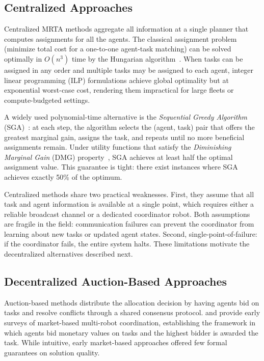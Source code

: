 \subsection{Centralized Approaches}
      \label{subsec:bg_centralized}

Centralized MRTA methods aggregate all information at a single planner that
computes assignments for all the agents.
The classical assignment problem (minimize total cost for a one-to-one
agent-task matching) can be solved optimally in $O(n^3)$ time by the Hungarian
algorithm~\cite{kuhn1955hungarian}.
When tasks can be assigned in any order and multiple tasks may be assigned to
each agent, integer linear programming (ILP) formulations achieve global
optimality but at exponential worst-case cost, rendering them impractical
for large fleets or compute-budgeted settings.

A widely used polynomial-time alternative is the \emph{Sequential Greedy
Algorithm} (SGA)~\cite{minoux1978accelerated}: at each step, the algorithm
selects the (agent, task) pair that offers the greatest marginal gain, assigns
the task, and repeats until no more beneficial assignments remain.
Under utility functions that satisfy the \emph{Diminishing Marginal Gain}
(DMG) property~\cite{fisher1978analysis}, SGA achieves at least half the
optimal assignment value.
This guarantee is tight: there exist instances where SGA achieves exactly
50\% of the optimum.

Centralized methods share two practical weaknesses.
First, they assume that all task and agent information is available at a single
point, which requires either a reliable broadcast channel or a dedicated
coordinator robot.
Both assumptions are fragile in the field: communication failures can prevent
the coordinator from learning about new tasks or updated agent states.
Second, single-point-of-failure: if the coordinator fails, the entire system
halts.
These limitations motivate the decentralized alternatives described next.


\subsection{Decentralized Auction-Based Approaches}
      \label{subsec:bg_decentralized}

Auction-based methods distribute the allocation decision by having agents bid
on tasks and resolve conflicts through a shared consensus protocol.
\citet{gerkey2002sold} and \citet{dias2006market} provide early surveys of
market-based multi-robot coordination, establishing the framework in which
agents bid monetary values on tasks and the highest bidder is awarded the task.
While intuitive, early market-based approaches offered few formal guarantees
on solution quality.

